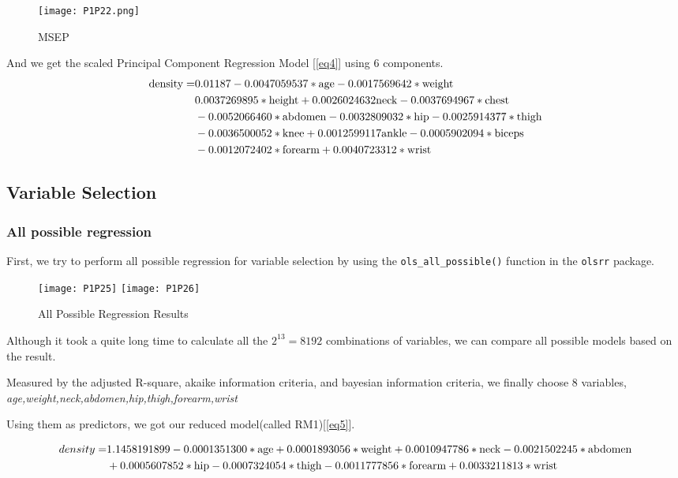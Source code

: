 \documentclass[11pt]{article}
\begin{document}
\begin{figure}[!htb]
\centering
\texttt{[image: P1P22.png]}
\caption{MSEP}\label{Fig19}
\end{figure}

And we get the scaled Principal Component Regression Model [\ref{eq4}] using 6 components.   
\begin{align}
	\text{density} = &0.01187-0.0047059537 *\text{age}-0.0017569642 *\text{weight}\notag\\
	& 0.0037269895*\text{height}+0.0026024632\text{neck}-0.0037694967*\text{chest}\notag\\
	&-0.0052066460*\text{abdomen} -0.0032809032*\text{hip}-0.0025914377*\text{thigh}\notag \\ 
    &-0.0036500052*\text{knee}+ 0.0012599117\text{ankle}-0.0005902094*\text{biceps}\notag\\
    & -0.0012072402*\text{forearm}+0.0040723312*\text{wrist}\label{eq4}  
\end{align}



\subsection{Variable Selection}\label{ch6}

\subsubsection{All possible regression}
First, we try to perform all possible regression for variable selection by using the \verb|ols_all_possible()| function in the \verb|olsrr| package.

\begin{figure}[!htb]
\centering
\texttt{[image: P1P25]}
\texttt{[image: P1P26]}
\caption{All Possible Regression Results}\label{Fig22}
\end{figure}

Although it took a quite long time to calculate all the $2^{13}=8192$ combinations of variables, we can compare all possible models based on the result.

Measured by the adjusted R-square, akaike information criteria, and bayesian information criteria, we finally choose 8 variables, {\it age,weight,neck,abdomen,hip,thigh,forearm,wrist}

Using them as predictors, we got our reduced model(called RM1)[\ref{eq5}].

  
 \begin{align}
density = &1.1458191899-0.0001351300*\text{age}+0.0001893056*\text{weight}+0.0010947786 *\text{neck}-0.0021502245*\text{abdomen}\notag\\&+0.0005607852*\text{hip}-0.0007324054*\text{thigh}-0.0011777856*\text{forearm}+0.0033211813*\text{wrist}\label{eq5}
\end{align}
\end{document}
